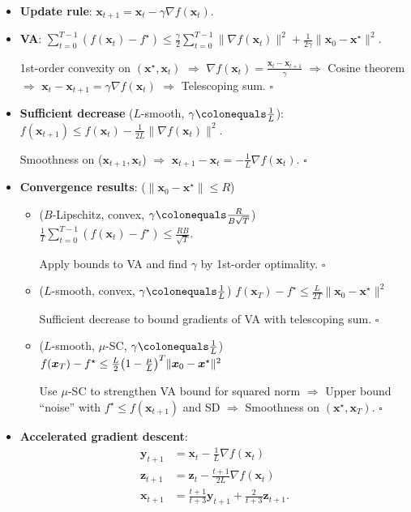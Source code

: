 \documentclass[8pt,a4paper]{extarticle}
\renewcommand{\proof}[1]{\begin{tcolorbox}#1 \hfill $\square$\end{tcolorbox}}
\newcommand{\lft}{\mathopen{}\mathclose\bgroup\left}
\newcommand{\rgt}{\aftergroup\egroup\right}
\renewcommand{\vec}[1]{\bm{#1}}
\newenvironment{topic}[1]
{\textbf{\sffamily \colorbox{black}{\rlap{\textbf{\textcolor{white}{#1}}}\hspace{\linewidth}\hspace{-2\fboxsep}}} \\ \vspace{0.2cm}}
{}
\begin{document}
\begin{multicols*}{2}
    \begin{topic}{Gradient descent}
        \begin{itemize}
            \item \textbf{Update rule}: $\vec{x}_{t+1} = \vec{x}_t - \gamma \nabla f(\vec{x}_t)$.
            \item \textbf{VA}: $\sum_{t=0}^{T-1} (f(\vec{x}_t) - f^\star) \leq \frac{\gamma}{2} \sum_{t=0}^{T-1} \| \nabla f(\vec{x}_t) \|^2 + \frac{1}{2 \gamma} \| \vec{x}_0 - \vec{x}^\star \|^2$.
                  \proof{1st-order convexity on $(\vec{x}^\star, \vec{x}_t)$ $\Rightarrow$ $\nabla f(\vec{x}_t) = \frac{\vec{x}_t - \vec{x}_{t+1}}{\gamma}$ $\Rightarrow$ Cosine theorem $\Rightarrow$ $\vec{x}_t - \vec{x}_{t+1} = \gamma \nabla f(\vec{x}_t)$ $\Rightarrow$ Telescoping sum.}
            \item \textbf{Sufficient decrease} ($L$-smooth, $\gamma \colonequals \frac{1}{L}$): $f(\vec{x}_{t+1}) \leq f(\vec{x}_t) - \frac{1}{2L} \| \nabla f(\vec{x}_t) \|^2$.
                  \proof{Smoothness on ($\vec{x}_{t+1}, \vec{x}_t$) $\Rightarrow$ $\vec{x}_{t+1} - \vec{x}_t = -\frac{1}{L} \nabla f(\vec{x}_t)$.}
            \item \textbf{Convergence results}: ($\| \vec{x}_0 - \vec{x}^\star \| \leq R$)
                  \begin{itemize}
                      \item ($B$-Lipschitz, convex, $\gamma \colonequals \frac{R}{B \sqrt{T}}$) $\frac{1}{T} \sum_{t=0}^{T-1} (f(\vec{x}_t) - f^\star) \leq \frac{RB}{\sqrt{T}}$.
                            \proof{Apply bounds to VA and find $\gamma$ by 1st-order optimality.}
                      \item ($L$-smooth, convex, $\gamma \colonequals \frac{1}{L}$) $f(\vec{x}_T) - f^\star \leq \frac{L}{2T} \| \vec{x}_0 - \vec{x}^\star \|^2$
                            \proof{Sufficient decrease to bound gradients of VA with telescoping sum.}
                      \item ($L$-smooth, $\mu$-SC, $\gamma \colonequals \frac{1}{L}$) $f(\vec{x}_T) - f^\star \leq \frac{L}{2} \lft( 1 - \frac{\mu}{L} \rgt)^T \| \vec{x}_0 - \vec{x}^\star \|^2$
                            \proof{Use $\mu$-SC to strengthen VA bound for squared norm $\Rightarrow$ Upper bound ``noise'' with $f^\star \leq f(\vec{x}_{t+1})$ and SD $\Rightarrow$ Smoothness on $(\vec{x}^\star, \vec{x}_T)$.}
                  \end{itemize}
            \item \textbf{Accelerated gradient descent}:
                  \begin{align*}
                      \vec{y}_{t+1} & = \vec{x}_t - \frac{1}{L} \nabla f(\vec{x}_t)                  \\
                      \vec{z}_{t+1} & = \vec{z}_t - \frac{t+1}{2L} \nabla f(\vec{x}_t)               \\
                      \vec{x}_{t+1} & = \frac{t+1}{t+3} \vec{y}_{t+1} + \frac{2}{t+3} \vec{z}_{t+1}.
                  \end{align*}
        \end{itemize}
    \end{topic}


\end{multicols*}
\end{document}
